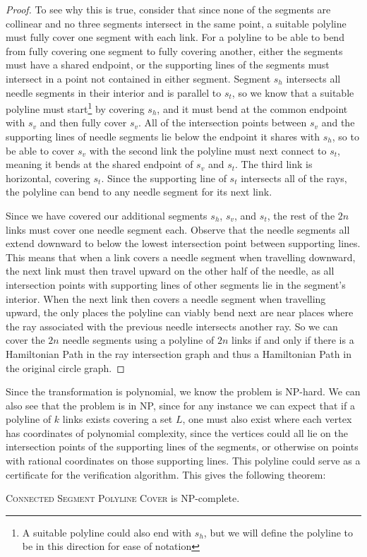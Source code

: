 \documentclass[]{llncs}
\newcommand{\consegcover}{\textsc{Connected Segment Polyline Cover}\xspace}
\begin{document}
\begin {proof}
To see why this is true, consider that since none of the segments are collinear and no three segments intersect in the same point, a suitable polyline must fully cover one segment with each link. For a polyline to be able to bend from fully covering one segment to fully covering another, either the segments must have a shared endpoint, or the supporting lines of the segments must intersect in a point not contained in either segment.
Segment $s_h$ intersects all needle segments in their interior and is parallel to $s_t$, so we know that a suitable polyline must start\footnote{A suitable polyline could also end with $s_h$, but we will define the polyline to be in this direction for ease of notation} by covering $s_h$, and it must bend at the common endpoint with $s_v$ and then fully cover $s_v$. All of the intersection points between $s_v$ and the supporting lines of needle segments lie below the endpoint it shares with $s_h$, so to be able to cover $s_v$ with the second link the polyline must next connect to $s_t$, meaning it bends at the shared endpoint of $s_v$ and $s_t$. The third link is horizontal, covering $s_t$. Since the supporting line of $s_t$ intersects all of the rays, the polyline can bend to any needle segment for its next link. 

Since we have covered our additional segments $s_h$, $s_v$, and $s_t$, the rest of the $2n$ links must cover one needle segment each. Observe that the needle segments all extend downward to below the lowest intersection point between supporting lines. This means that when a link covers a needle segment when travelling downward, the next link must then travel upward on the other half of the needle, as all intersection points with supporting lines of other segments lie in the segment's interior. When the next link then covers a needle segment when travelling upward, the only places the polyline can viably bend next are near places where the ray associated with the previous needle intersects another ray. So we can cover the $2n$ needle segments using a polyline of $2n$ links if and only if there is a Hamiltonian Path in the ray intersection graph and thus a Hamiltonian Path in the original circle graph. 
\end {proof}

Since the transformation is polynomial, we know the problem is NP-hard. We can also see that the problem is in NP, since for any instance we can expect that if a polyline of $k$ links exists covering a set $L$, one must also exist where each vertex has coordinates of polynomial complexity, since the vertices could all lie on the intersection points of the supporting lines of the segments, or otherwise on points with rational coordinates on those supporting lines. This polyline could serve as a certificate for the verification algorithm. This gives the following theorem:
\begin{theorem}
  \consegcover is NP-complete.
\end{theorem}
\end{document}
